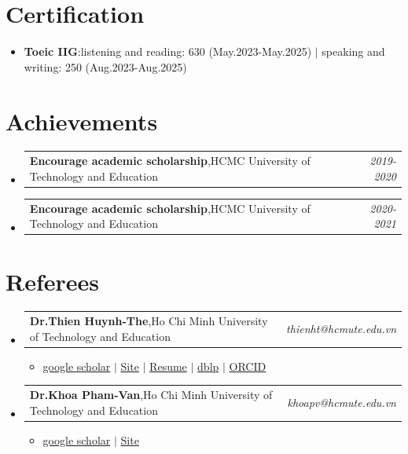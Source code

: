 \documentclass[a4paper,11pt]{article}
\makeatletter
\newcommand{\resumeItem}[2]{
  \item{
    \textbf{#1}{:\hspace{0.5mm}#2 \vspace{-0.5mm}}
  }
}
\newcommand{\resumePOR}[3]{
\vspace{0.5mm}\item
    \begin{tabular*}{0.97\textwidth}[t]{l@{\extracolsep{\fill}}r}
        \textbf{#1},\hspace{0.3mm}#2 & \textit{\small{#3}} 
    \end{tabular*}
    \vspace{-2mm}
}
\newcommand{\resumeSubItem}[2]{\resumeItem{#1}{#2}\vspace{-4pt}}
\newcommand{\resumeSubHeadingListStart}{\begin{itemize}[leftmargin=*,labelsep=0mm]}
\newcommand{\resumeHeadingSkillStart}{\begin{itemize}[leftmargin=*,itemsep=1.7mm, rightmargin=2ex]}
\newcommand{\resumeItemListStart}{\begin{justify}\begin{itemize}[leftmargin=3ex, rightmargin=2ex, noitemsep,labelsep=1.2mm,itemsep=0mm]\small}
\newcommand{\resumeSubHeadingListEnd}{\end{itemize}\vspace{4mm}}
\newcommand{\resumeHeadingSkillEnd}{\end{itemize}\vspace{-4mm}}
\newcommand{\resumeItemListEnd}{\end{itemize}\end{justify}\vspace{-2mm}}
\makeatother
\begin{document}
\section{Certification}
\resumeHeadingSkillStart
 \resumeSubItem{Toeic IIG} %
    {listening and reading: 630 (May.2023-May.2025) $|$ speaking and writing: 250 (Aug.2023-Aug.2025)}
 \resumeHeadingSkillEnd



\section{Achievements}
\vspace{-0.2mm}
\resumeSubHeadingListStart
\resumePOR{Encourage academic scholarship} %
    {HCMC University of Technology and Education} %
    {2019-2020} %
\resumePOR{Encourage academic scholarship} %
    {HCMC University of Technology and Education} %
    {2020-2021} %
\resumeSubHeadingListEnd
\vspace{-2mm}



\section{Referees}
\vspace{-0.6mm}
\resumeSubHeadingListStart
\resumePOR{Dr.Thien Huynh-The} %
    {Ho Chi Minh University of Technology and Education} %
    {thienht@hcmute.edu.vn}
    \resumeItemListStart
      \item {\href{https://scholar.google.com/citations?user=_MLGtqEAAAAJ&;fbclid=IwAR08QAZBO_b35fdm1bM8v0fHEfl3-qivwMlnEFMarkt81gryNO2xrK8cubM}{google scholar}
          $|$ \href{https://sites.google.com/site/thienhuynhthe/home}{Site}
          $|$ \href{https://drive.google.com/file/d/1bVDb_Pw2yzkDWXj63IQiVxTfyNXbOE96/view}{Resume}
          $|$ \href{https://dblp.uni-trier.de/pid/153/6644.html}{dblp}
          $|$ \href{https://orcid.org/0000-0002-9172-2935}{ORCID} }
    \resumeItemListEnd
\resumePOR{Dr.Khoa Pham-Van}
    {Ho Chi Minh University of Technology and Education}
    {khoapv@hcmute.edu.vn}
    \resumeItemListStart
    \item
    {\href{https://scholar.google.co.kr/citations?user=t_abZ6kAAAAJ&;hl=en}{google scholar}
      $|$ \href{https://sites.google.com/site/khoaphamhcmute/}{Site} }
    \resumeItemListEnd
\resumeSubHeadingListEnd
\vspace{-6mm}

\end{document}

